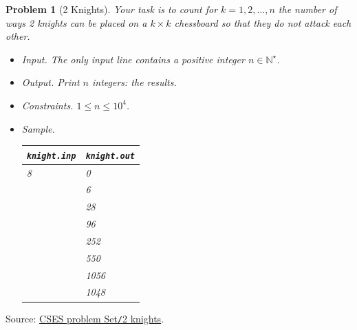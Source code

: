 \documentclass{article}
\newtheorem{problem}{Problem}
\begin{document}
\begin{problem}[2 Knights]
	Your task is to count for $k = 1,2,\ldots,n$ the number of ways 2 knights can be placed on a $k\times k$ chessboard so that they do not attack each other.
	\begin{itemize}
		\item {\sf Input.} The only input line contains a positive integer $n\in\mathbb{N}^\star$.
		\item {\sf Output.} Print $n$ integers: the results.
		\item {\sf Constraints.} $1\le n\le10^4$.
		\item {\sf Sample.}
		\begin{table}[H]
			\centering
			\begin{tabular}{|l|l|}
				\hline
				\verb|knight.inp| & \verb|knight.out| \\
				\hline
				8 & 0 \\
				& 6 \\
				& 28 \\
				& 96 \\
				& 252 \\
				& 550 \\
				& 1056 \\
				& 1048 \\
				\hline
			\end{tabular}
		\end{table}
	\end{itemize}
\end{problem}
Source: \href{https://cses.fi/problemset/task/1072}{CSES problem Set{\tt/}2 knights}.
\end{document}

